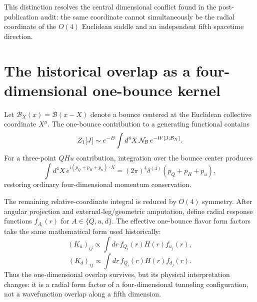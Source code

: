 \documentclass[11pt]{article}
\begin{document}
This distinction resolves the central dimensional conflict found in the post-publication audit: the same coordinate cannot simultaneously be the radial coordinate of the $O(4)$ Euclidean saddle and an independent fifth spacetime direction.

\section{The historical overlap as a four-dimensional one-bounce kernel}
Let $\mathcal B_X(x)=\mathcal B(x-X)$ denote a bounce centered at the Euclidean collective coordinate $X^\mu$. The one-bounce contribution to a generating functional contains
\begin{equation}
 Z_1[J]\sim e^{-B}\int d^4X\,{\cal N}_{\mathcal B}\,e^{-W[J;\mathcal B_X]}.
\end{equation}
For a three-point $QHu$ contribution, integration over the bounce center produces
\begin{equation}
\int d^4X\,e^{i(p_Q+p_H+p_u)\cdot X}
=(2\pi)^4\delta^{(4)}(p_Q+p_H+p_u),
\end{equation}
restoring ordinary four-dimensional momentum conservation.

The remaining relative-coordinate integral is reduced by $O(4)$ symmetry. After angular projection and external-leg/geometric amputation, define radial response functions $f_{A_i}(r)$ for $A\in\{Q,u,d\}$. The effective one-bounce flavor form factors take the same mathematical form used historically:
\begin{equation}
(K_u)_{ij}\propto\int dr\,f_{Q_i}(r)H(r)f_{u_j}(r),
\end{equation}
\begin{equation}
(K_d)_{ij}\propto\int dr\,f_{Q_i}(r)H(r)f_{d_j}(r).
\end{equation}
Thus the one-dimensional overlap survives, but its physical interpretation changes: it is a radial form factor of a four-dimensional tunneling configuration, not a wavefunction overlap along a fifth dimension.
\end{document}
